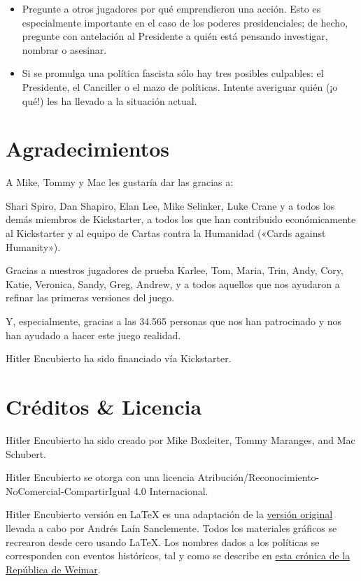 \documentclass[13pt,a4paper,twocolumn,titlepage]{scrartcl}
\begin{document}
\begin{itemize}
		\item \textcolor{Blue3}{Pregunte a otros jugadores por qué emprendieron una acción.} Esto es especialmente importante en el caso de los poderes presidenciales; de hecho, pregunte con antelación al Presidente a quién está pensando investigar, nombrar o asesinar.
		
		\item \textcolor{Blue3}{Si se promulga una política \textcolor{fascist}{fascista} sólo hay tres posibles culpables: el Presidente, el Canciller o el mazo de políticas.} Intente averiguar quién (¡o qué!) les ha llevado a la situación actual.
		
	\end{itemize}
	
	\section*{Agradecimientos}
	\textcolor{Blue3}{A Mike, Tommy y Mac les gustaría dar las gracias a:}
	
	Shari Spiro, Dan Shapiro, Elan Lee, Mike Selinker, Luke Crane y a todos los demás miembros de Kickstarter, a todos los que han contribuido económicamente al Kickstarter y al equipo de Cartas contra la Humanidad («Cards against Humanity»).
	
	Gracias a nuestros jugadores de prueba Karlee, Tom, Maria, Trin, Andy, Cory, Katie, Veronica, Sandy, Greg, Andrew, y a todos aquellos que nos ayudaron a refinar las primeras versiones del juego.
	
	Y, especialmente, gracias a las 34.565 personas que nos han patrocinado y nos han ayudado a hacer este juego realidad.
	
	\clearpage
	
	Hitler Encubierto ha sido financiado vía \textcolor{Blue3}{Kickstarter}.
	\section*{Créditos \& Licencia}
	Hitler Encubierto ha sido creado por Mike Boxleiter, Tommy Maranges, and Mac Schubert.
	
	Hitler Encubierto se otorga con una licencia Atribución/Reconocimiento-NoComercial-CompartirIgual 4.0 Internacional.
	
	Hitler Encubierto versión en LaTeX es una adaptación de la \hyperref{https://www.secrethitler.com/}{}{}{versión original} llevada a cabo por Andrés Laín Sanclemente. Todos los materiales gráficos se recrearon desde cero usando LaTeX. Los nombres dados a los políticas se corresponden con eventos históricos, tal y como se describe en \hyperref{https://www.weimarer-republik.net/themenportal/chronik-1918-bis-1933/1932/}{}{}{esta crónica de la República de Weimar}.
	
\end{document}
